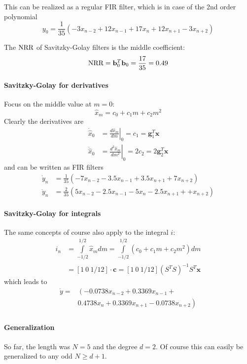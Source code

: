 This can be realized as a regular FIR filter, which is in case of the 2nd order
polynomial
\begin{equation*}
	y_0 = \frac{1}{35} \left( -3 x_{n-2} + 12 x_{n-1} + 17 x_n + 12 x_{n+1} - 3 x_{n+2}\right)
\end{equation*}

The $\operatorname{\text{NRR}}$ of Savitzky-Golay filters is the middle coefficient:
\begin{equation*}
	\operatorname{\text{NRR}} = \mathbf{b}_0^T \mathbf{b}_0 = \frac{17}{35} = 0.49
\end{equation*}

\paragraph{Savitzky-Golay for derivatives}
Focus on the middle value at $m=0$:
\begin{equation*}
	\hat{x}_m = c_0 + c_1 m + c_2 m^2
\end{equation*}
Clearly the derivatives are
\begin{align*}
	\dot{\hat{x}}_0 &=  \left.\frac{d\hat{x}_m}{dm}\right|_0 = c_1 = \mathbf{g}_1^T\mathbf{x} \\
	\ddot{\hat{x}}_0 &= \left.\frac{d^2\hat{x}_m}{dm^2}\right|_0 = 2 c_2 = 2 \mathbf{g}_2^T\mathbf{x}
\end{align*}
and can be written as FIR filters
\begin{align*}
	\dot{y}_n &= \frac{1}{35} \left( -7 x_{n-2} - 3.5 x_{n-1} + 3.5 x_{n+1} + 7 x_{n+2}\right) \\
	\ddot{y}_n &= \frac{2}{35} \left( 5 x_{n-2} - 2.5 x_{n-1} - 5 x_n - 2.5 x_{n+1} + + x_{n+2}\right)
\end{align*}

\paragraph{Savitzky-Golay for integrals}
The same concepts of course also apply to  the integral $i$:
\begin{align*}
	i_n &= \int\limits_{-1/2}^{1/2} \hat{x}_m dm = \int\limits_{-1/2}^{1/2} (c_0 + c_1 m + c_2 m^2) dm \\
	&= \left[1 \: 0 \: 1/12 \right] \cdot \mathbf{c} = \left[1 \: 0 \: 1/12 \right] \left(S^T S \right)^{-1} S^T \mathbf{x}
\end{align*}
which leads to
\begin{align*}
	\dot{y} = & \left(-0.0738 x_{n-2} + 0.3369 x_{n-1} + \right. \\ 
	& \left. 0.4738 x_n + 0.3369 x_{n+1} - 0.0738 x_{n+2}  \right) \\
\end{align*}

\paragraph{Generalization}
So far, the length was $N=5$ and the degree $d=2$. Of course this can easily be 
generalized to any odd $N \geq d+1$. 
